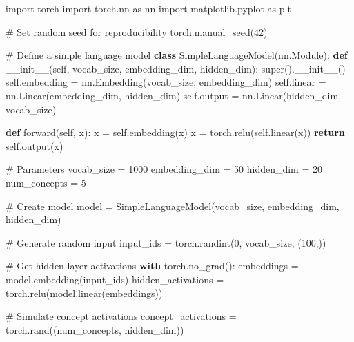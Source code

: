 \documentclass[
  letterpaper,
  DIV=11,
  numbers=noendperiod]{scrreprt}
\newenvironment{Shaded}{\begin{snugshade}}{\end{snugshade}}
\newcommand{\BuiltInTok}[1]{\textcolor[rgb]{0.00,0.23,0.31}{#1}}
\newcommand{\CommentTok}[1]{\textcolor[rgb]{0.37,0.37,0.37}{#1}}
\newcommand{\ControlFlowTok}[1]{\textcolor[rgb]{0.00,0.23,0.31}{\textbf{#1}}}
\newcommand{\DecValTok}[1]{\textcolor[rgb]{0.68,0.00,0.00}{#1}}
\newcommand{\FunctionTok}[1]{\textcolor[rgb]{0.28,0.35,0.67}{#1}}
\newcommand{\ImportTok}[1]{\textcolor[rgb]{0.00,0.46,0.62}{#1}}
\newcommand{\KeywordTok}[1]{\textcolor[rgb]{0.00,0.23,0.31}{\textbf{#1}}}
\newcommand{\NormalTok}[1]{\textcolor[rgb]{0.00,0.23,0.31}{#1}}
\newcommand{\OperatorTok}[1]{\textcolor[rgb]{0.37,0.37,0.37}{#1}}
\newcommand{\VariableTok}[1]{\textcolor[rgb]{0.07,0.07,0.07}{#1}}
\begin{document}
\begin{Shaded}
\begin{Highlighting}[]
\ImportTok{import}\NormalTok{ torch}
\ImportTok{import}\NormalTok{ torch.nn }\ImportTok{as}\NormalTok{ nn}
\ImportTok{import}\NormalTok{ matplotlib.pyplot }\ImportTok{as}\NormalTok{ plt}

\CommentTok{\# Set random seed for reproducibility}
\NormalTok{torch.manual\_seed(}\DecValTok{42}\NormalTok{)}

\CommentTok{\# Define a simple language model}
\KeywordTok{class}\NormalTok{ SimpleLanguageModel(nn.Module):}
    \KeywordTok{def} \FunctionTok{\_\_init\_\_}\NormalTok{(}\VariableTok{self}\NormalTok{, vocab\_size, embedding\_dim, hidden\_dim):}
        \BuiltInTok{super}\NormalTok{().}\FunctionTok{\_\_init\_\_}\NormalTok{()}
        \VariableTok{self}\NormalTok{.embedding }\OperatorTok{=}\NormalTok{ nn.Embedding(vocab\_size, embedding\_dim)}
        \VariableTok{self}\NormalTok{.linear }\OperatorTok{=}\NormalTok{ nn.Linear(embedding\_dim, hidden\_dim)}
        \VariableTok{self}\NormalTok{.output }\OperatorTok{=}\NormalTok{ nn.Linear(hidden\_dim, vocab\_size)}

    \KeywordTok{def}\NormalTok{ forward(}\VariableTok{self}\NormalTok{, x):}
\NormalTok{        x }\OperatorTok{=} \VariableTok{self}\NormalTok{.embedding(x)}
\NormalTok{        x }\OperatorTok{=}\NormalTok{ torch.relu(}\VariableTok{self}\NormalTok{.linear(x))}
        \ControlFlowTok{return} \VariableTok{self}\NormalTok{.output(x)}

\CommentTok{\# Parameters}
\NormalTok{vocab\_size }\OperatorTok{=} \DecValTok{1000}
\NormalTok{embedding\_dim }\OperatorTok{=} \DecValTok{50}
\NormalTok{hidden\_dim }\OperatorTok{=} \DecValTok{20}
\NormalTok{num\_concepts }\OperatorTok{=} \DecValTok{5}

\CommentTok{\# Create model}
\NormalTok{model }\OperatorTok{=}\NormalTok{ SimpleLanguageModel(vocab\_size, embedding\_dim, hidden\_dim)}

\CommentTok{\# Generate random input}
\NormalTok{input\_ids }\OperatorTok{=}\NormalTok{ torch.randint(}\DecValTok{0}\NormalTok{, vocab\_size, (}\DecValTok{100}\NormalTok{,))}

\CommentTok{\# Get hidden layer activations}
\ControlFlowTok{with}\NormalTok{ torch.no\_grad():}
\NormalTok{    embeddings }\OperatorTok{=}\NormalTok{ model.embedding(input\_ids)}
\NormalTok{    hidden\_activations }\OperatorTok{=}\NormalTok{ torch.relu(model.linear(embeddings))}

\CommentTok{\# Simulate concept activations}
\NormalTok{concept\_activations }\OperatorTok{=}\NormalTok{ torch.rand((num\_concepts, hidden\_dim))}


\end{Highlighting}
\end{Shaded}
\end{document}
